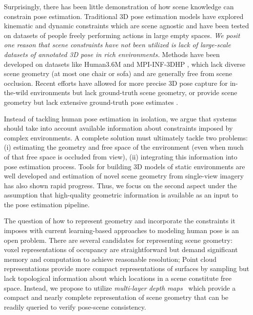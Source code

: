 \documentclass[times,referee,twocolumn,final,authoryear]{elsarticle}
\begin{document}
Surprisingly, there has been little demonstration of how scene knowledge can
constrain pose estimation. Traditional 3D pose estimation models have explored 
kinematic and dynamic constraints which are scene agnostic and have been tested
on datasets of people freely performing actions in large empty spaces.  
{\em We posit one reason
that scene constraints have not been utilized is lack of large-scale datasets
of annotated 3D pose in rich environments.} Methods have been developed on datasets like
Human3.6M \citep{h36m_pami} and MPI-INF-3DHP \citep{mono_3dhp2017}, which lack
diverse scene geometry (at most one chair or sofa) and are generally free from scene 
occlusion.  Recent efforts have allowed for more precise 3D pose capture for in-the-wild 
environments \citep{inthewildeccv2018} but lack ground-truth scene geometry, or provide
scene geometry but lack extensive ground-truth pose estimates \citep{mpii_scene}.

Instead of tackling human pose estimation in isolation, we argue that systems
should take into account available information about constraints imposed by
complex environments. A complete solution must ultimately tackle two problems:
(i) estimating the geometry and free space of the environment (even when much
of that free space is occluded from view), (ii) integrating this information
into pose estimation process. Tools for building 3D models of static
environments are well developed and estimation of novel scene geometry from
single-view imagery has also shown rapid progress. Thus, we focus on the second
aspect under the assumption that high-quality geometric information is available
as an input to the pose estimation pipeline.

The question of how to represent geometry and incorporate the 
constraints it imposes with current learning-based approaches to modeling human
pose is an open problem.  There are several candidates for representing scene
geometry: voxel representations of occupancy \citep{volumetric} are
straightforward but demand significant memory and computation to achieve
reasonable resolution; Point cloud \citep{pointcloud} representations provide
more compact representations of surfaces by sampling but lack topological
information about which locations in a scene constitute free space. Instead, we
propose to utilize {\em multi-layer depth maps}~\citep{mdp} which provide a compact 
and nearly complete representation of scene geometry that can be readily
queried to verify pose-scene consistency.
\end{document}

